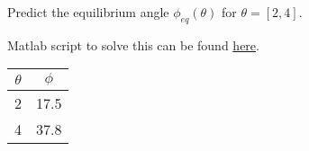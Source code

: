 Predict the equilibrium angle $\phi_{eq}(\theta)$ for $\theta = \left[2, 4\right]$.

\begin{solution}
    Matlab script to solve this can be found \href{https://gist.github.com/wsh32/645545ef47231629cebed1e9ac5707e6}{here}.
    
    \begin{center}
\begin{tabular}{ c|c }
    $\theta$ & $\phi$ \\
    \hline
    2 & 17.5 \\
    4 & 37.8 \\
\end{tabular}
\end{center}
\end{solution}